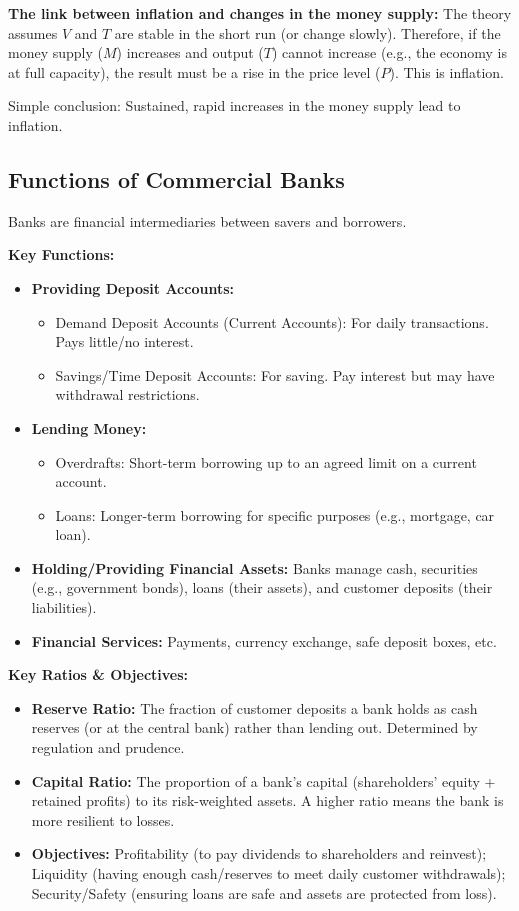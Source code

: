 \documentclass[11pt, a4paper, twoside]{book}
\begin{document}
\textbf{The link between inflation and changes in the money supply:} The theory assumes $V$ and $T$ are stable in the short run (or change slowly). Therefore, if the money supply ($M$) increases and output ($T$) cannot increase (e.g., the economy is at full capacity), the result must be a rise in the price level ($P$). This is inflation.

\begin{coreidea}
Simple conclusion: Sustained, rapid increases in the money supply lead to inflation.
\end{coreidea}

\subsection{Functions of Commercial Banks}

Banks are financial intermediaries between savers and borrowers.

\textbf{Key Functions:}
\begin{itemize}
  \item \textbf{Providing Deposit Accounts:}
  \begin{itemize}
    \item Demand Deposit Accounts (Current Accounts): For daily transactions. Pays little/no interest.
    \item Savings/Time Deposit Accounts: For saving. Pay interest but may have withdrawal restrictions.
  \end{itemize}
  \item \textbf{Lending Money:}
  \begin{itemize}
    \item Overdrafts: Short-term borrowing up to an agreed limit on a current account.
    \item Loans: Longer-term borrowing for specific purposes (e.g., mortgage, car loan).
  \end{itemize}
  \item \textbf{Holding/Providing Financial Assets:} Banks manage cash, securities (e.g., government bonds), loans (their assets), and customer deposits (their liabilities).
  \item \textbf{Financial Services:} Payments, currency exchange, safe deposit boxes, etc.
\end{itemize}

\textbf{Key Ratios \& Objectives:}
\begin{itemize}
  \item \textbf{Reserve Ratio:} The fraction of customer deposits a bank holds as cash reserves (or at the central bank) rather than lending out. Determined by regulation and prudence.
  \item \textbf{Capital Ratio:} The proportion of a bank's capital (shareholders' equity + retained profits) to its risk-weighted assets. A higher ratio means the bank is more resilient to losses.
  \item \textbf{Objectives:} Profitability (to pay dividends to shareholders and reinvest); Liquidity (having enough cash/reserves to meet daily customer withdrawals); Security/Safety (ensuring loans are safe and assets are protected from loss).
\end{itemize}
\end{document}
